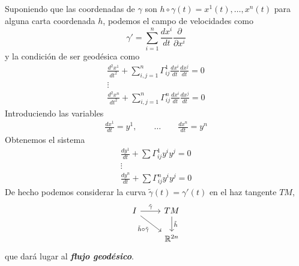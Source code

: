 \documentclass[spanish]{book}
\theoremstyle{definition}
\newcommand{\R}{\mathbb{R}}
\begin{document}
	Suponiendo que las coordenadas de $\gamma$ son $h\circ\gamma(t)=x^1(t),\ldots,x^n(t)$ para alguna carta coordenada $h$, podemos el campo de velocidades como
	\[\gamma'=\sum_{i=1}^n\frac{dx^i}{dt}\frac{\partial}{\partial x^i}\]
	y la condición de ser geodésica como
	\begin{gather*}
		\frac{d^2x^1}{dt^2}+\sum_{i,j=1}^n\Gamma_{ij}^1\frac{dx^i}{dt}\frac{dx^j}{dt}=0\\
		\vdots\\
		\frac{d^2x^n}{dt^2}+\sum_{i,j=1}^n\Gamma_{ij}^n\frac{dx^i}{dt}\frac{dx^j}{dt}=0
	\end{gather*}
	Introduciendo las variables
	\begin{gather*}
		\frac{dx^1}{dt}=y^1,\qquad	\ldots \qquad
		\frac{dx^n}{dt}=y^n
	\end{gather*}
	Obtenemos el sistema
	\begin{gather*}
		\frac{dy^1}{dt}+\sum\Gamma_{ij}^1y^iy^j=0\\
		\vdots\\
		\frac{dy^n}{dt}+\sum\Gamma_{ij}^ny^iy^j=0
	\end{gather*}
	De hecho podemos considerar la curva $\tilde{\gamma}(t)=\gamma'(t)$ en el haz tangente $TM$,
	\[\begin{tikzcd}
		I\arrow{r}{\tilde{\gamma}}\arrow[swap]{rd}{\tilde{h}\circ\tilde{\gamma}}& TM\arrow{d}{\tilde{h}}\\
		&\R^{2n}		
	\end{tikzcd}\]
	que dará lugar al \textbf{\textit{flujo geodésico}}.
	
\end{document}
